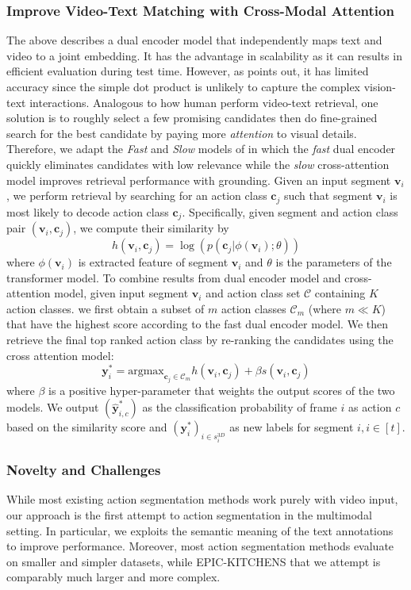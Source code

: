 \subsubsection{Improve Video-Text Matching with Cross-Modal Attention}
The above describes a dual encoder model that independently maps text and video to a joint embedding. It has the advantage in scalability as it can results in efficient evaluation during test time. However, as  points out, it has limited accuracy since the simple dot product is unlikely to capture the complex vision-text interactions. Analogous to how human perform video-text retrieval, one solution is to roughly select a few promising candidates then do fine-grained search for the best candidate by paying more \emph{attention} to visual details. Therefore, we adapt the \emph{Fast} and \emph{Slow} models of  in which the \emph{fast} dual encoder quickly eliminates candidates with low relevance while the \emph{slow} cross-attention model improves retrieval performance with grounding. Given an input segment $\mathbf{v}_i$, we perform retrieval by searching for an action class $\mathbf{c}_j$ such that segment $\mathbf{v}_i$ is most likely to decode action class $\mathbf{c}_j$. Specifically, given segment and action class pair $(\mathbf{v}_i, \mathbf{c}_j)$, we compute their similarity by \[
    h(\mathbf{v}_i, \mathbf{c}_j) = \log (p(\mathbf{c}_j|\phi(\mathbf{v}_i);\theta))
\]
where $\phi(\mathbf{v}_i)$ is extracted feature of segment $\mathbf{v}_i$ and $\theta$ is the parameters of the transformer model. To combine results from dual encoder model and cross-attention model, given input segment $\mathbf{v}_i$ and action class set $\mathcal{C}$ containing $K$ action classes. we first obtain a subset of $m$ action classes $\mathcal{C}_m$ (where $m \ll K$) that have the highest score according to the fast dual encoder model. We then retrieve the final top ranked action class by re-ranking the candidates using the cross attention model:
\[
    \mathbf{y}^*_i=\text{argmax}_{\mathbf{c}_j\in \mathcal{C}_m} h(\mathbf{v}_i, \mathbf{c}_j) + \beta s(\mathbf{v}_i,\mathbf{c}_j)
\]
where $\beta$ is a positive hyper-parameter that weights the output scores of the two models. We output $(\hat{\mathbf{y}}^*_{i,c})$ as the classification probability of frame $i$ as action $c$ based on the similarity score and $(\mathbf{y}^*_i)_{i\in s_i^{3D}}$ as new labels for segment $i,i\in[t]$.

\subsubsection{Novelty and Challenges}
While most existing action segmentation methods work purely with video input, our approach is the first attempt to action segmentation in the multimodal setting. In particular, we exploits the semantic meaning of the text annotations to improve performance. Moreover, most action segmentation methods evaluate on smaller and simpler datasets, while EPIC-KITCHENS that we attempt is comparably much larger and more complex.

